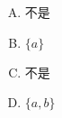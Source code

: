 {{        %
        \begin{practices}
            \begin{enumerate}[A.]
                \item 不是
                \item $\{a\}$
                \item 不是
                \item $\{a, b\}$
            \end{enumerate}
        \end{practices}

        \begin{practices}
            
        \end{practices}
    }
}
